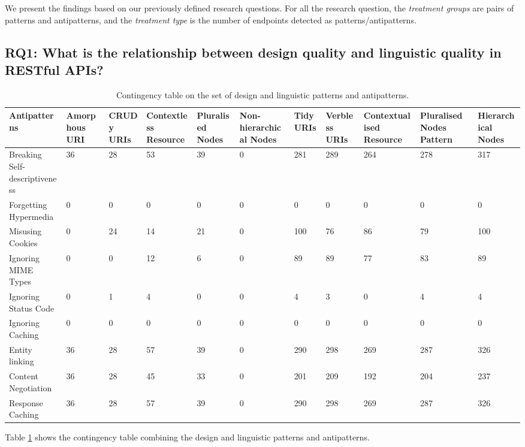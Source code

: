 \documentclass[a4paper,12pt]{article}
\begin{document}
\clearpage

We present the findings based on our previously defined research questions. For all the research question, the \textit{treatment groups} are pairs of patterns and antipatterns, and the \textit{treatment type} is the number of endpoints detected as patterns/antipatterns.

\subsection{\textbf{RQ1:} What is the relationship between design quality and linguistic quality in RESTful APIs?}

\begin{table}[ht!]
\scriptsize
\begin{tabular}{|p{15mm}|p{9mm}|p{9mm}|p{9mm}|p{9mm}|p{9mm}|p{9mm}|p{9mm}|p{9mm}|p{9mm}|p{9mm}|}
\hline Antipatterns & Amor\-phous URI & CRUDy URIs & Context\-less Resource & Pluralised Nodes& Non-hiera\-rchical Nodes & Tidy URIs & Verbless URIs & Context\-ualised Resource & Pluralised Nodes Pattern& Hierar\-chical Nodes  \\
\hline 
 Breaking Self-descriptiveness &
 36 &
 28 &
 53 &
 39 &
 0 &
 281 &
 289 &
 264 &
 278 &
 317
\\ \hline
 Forgetting Hypermedia &
 0 &
 0 &
 0 &
 0 &
 0 &
 0 &
 0 &
 0 &
 0 &
 0
\\ \hline
 Misusing Cookies &
 0 &
 24 &
 14 &
 21 &
 0 &
 100 &
 76 &
 86 &
 79 &
 100
\\ \hline
Ignoring MIME Types &
 0 &
 0 &
 12 &
 6 &
 0 &
 89 &
 89 &
 77 &
 83 &
 89
\\ \hline
Ignoring Status Code &
 0 &
 1 &
 4 &
 0 &
 0 &
 4 &
 3 &
 0 &
 4 &
 4
\\ \hline
Ignoring Caching &
 0 &
 0 &
 0 &
 0 &
 0 &
 0 &
 0 &
 0 &
 0 &
 0
\\ \hline
Entity linking &
 36 &
 28 &
 57 &
 39 &
 0 &
 290 &
 298 &
 269 &
 287 &
 326
\\ \hline
Content Negotiation &
 36 &
 28 &
 45 &
 33 &
 0 &
 201 &
 209 &
 192 &
 204 &
 237
\\ \hline
Response Caching &
 36 &
 28 &
 57 &
 39 &
 0 &
 290 &
 298 &
 269 &
 287 &
 326
\\ \hline
\end{tabular}
\caption{Contingency table on the set of design and linguistic patterns and antipatterns.}
\label{contingency table}
\end{table}

Table \ref{contingency table} shows the contingency table combining the design and linguistic patterns and antipatterns.
\end{document}
